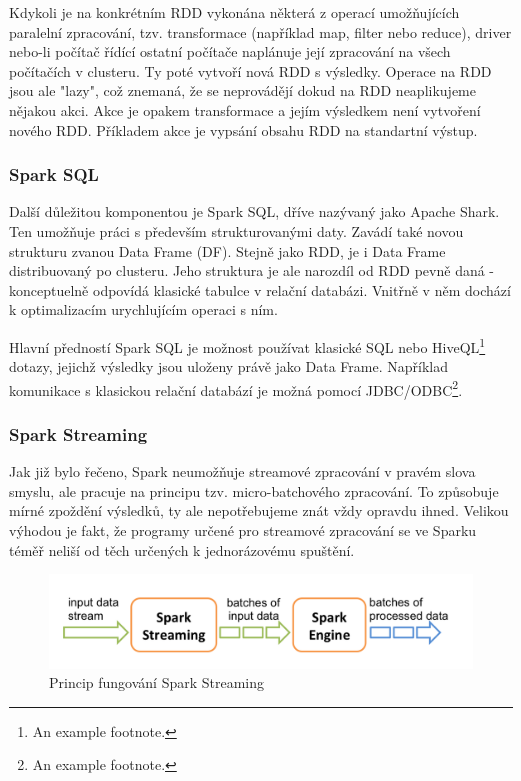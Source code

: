 \documentclass[thesis=B,czech]{FITthesis}[2012/06/26]
\begin{document}
	Kdykoli je na konkrétním RDD vykonána některá z operací umožňujících paralelní zpracování, tzv. transformace (například map, filter nebo reduce), driver nebo-li počítač řídící ostatní počítače naplánuje její zpracování na všech počítačích v clusteru. Ty poté vytvoří nová RDD s výsledky. Operace na RDD jsou ale "lazy", což znemaná, že se neprovádějí dokud na RDD neaplikujeme nějakou akci. Akce je opakem transformace a jejím výsledkem není vytvoření nového RDD. Příkladem akce je vypsání obsahu RDD na standartní výstup. 

\subsubsection{Spark SQL}
	Další důležitou komponentou je Spark SQL, dříve nazývaný jako Apache Shark. Ten umožňuje práci s především strukturovanými daty. Zavádí také novou strukturu zvanou Data Frame (DF). Stejně jako RDD, je i Data Frame distribuovaný po clusteru. Jeho struktura je ale narozdíl od RDD pevně daná - konceptuelně odpovídá klasické tabulce v relační databázi. Vnitřně v něm dochází k optimalizacím urychlujícím operaci s ním. 
	
	Hlavní předností Spark SQL je možnost používat klasické SQL nebo HiveQL\footnote{An example footnote.} dotazy, jejichž výsledky jsou uloženy právě jako Data Frame. Například komunikace s klasickou relační databází je možná pomocí JDBC/ODBC\footnote{An example footnote.}. 


\subsubsection{Spark Streaming}
	Jak již bylo řečeno, Spark neumožňuje streamové zpracování v pravém slova smyslu, ale pracuje na principu tzv. micro-batchového zpracování. To způsobuje mírné zpoždění výsledků, ty ale nepotřebujeme znát vždy opravdu ihned. Velikou výhodou je fakt, že programy určené pro streamové zpracování se ve Sparku téměř neliší od těch určených k jednorázovému spuštění. 

	\begin{figure}[ht]
    	\centering
    	\includegraphics[width=1\textwidth]{images/spark-streaming-flow.png}
    	\caption{Princip fungování Spark Streaming\cite{streaming-guide}}
    	\label{fig:spark_streaming_flow}
	\end{figure}
	
\end{document}
